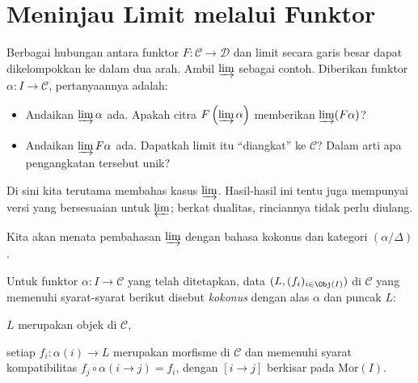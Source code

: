 
\section{Meninjau Limit melalui Funktor}\label{sec:limit-functor}
\hypertarget{o014.aljabr2.chapter1.limits-through-functors}{ }

Berbagai hubungan antara funktor $F: \mathcal{C} \to \mathcal{D}$ dan limit
secara garis besar dapat dikelompokkan ke dalam dua arah. Ambil $\varinjlim$ sebagai
contoh. Diberikan funktor $\alpha: I \to \mathcal{C}$, pertanyaannya adalah:
\begin{itemize}
	\item Andaikan $\varinjlim \alpha$ ada. Apakah citra
	$F\left(\varinjlim \alpha\right)$ memberikan $\varinjlim (F\alpha)$?
	\item Andaikan $\varinjlim F\alpha$ ada. Dapatkah limit itu
	``diangkat'' ke $\mathcal{C}$? Dalam arti apa pengangkatan tersebut unik?
\end{itemize}

Di sini kita terutama membahas kasus $\varinjlim$. Hasil-hasil ini tentu juga
mempunyai versi yang bersesuaian untuk $\varprojlim$; berkat dualitas,
rinciannya tidak perlu diulang.

Kita akan menata pembahasan $\varinjlim$ dengan bahasa kokonus dan kategori
$(\alpha/\Delta)$.

\begin{konvensi}\label{con:limit-cone}
	Untuk funktor $\alpha: I \to \mathcal{C}$ yang telah ditetapkan, data
	$(L, (f_i)_{i \in \Obj(I)})$ di $\mathcal{C}$ yang memenuhi syarat-syarat
	berikut disebut \emph{kokonus} dengan alas $\alpha$ dan puncak $L$:
	\begin{compactitem}
		\item $L$ merupakan objek di $\mathcal{C}$,
		\item setiap $f_i : \alpha(i) \to L$ merupakan morfisme di
		$\mathcal{C}$ dan memenuhi syarat kompatibilitas
		$f_j \circ \alpha(i \to j) = f_i$, dengan $[i \to j]$ berkisar pada
		$\mathrm{Mor}(I)$.
	\end{compactitem}
\end{konvensi}

